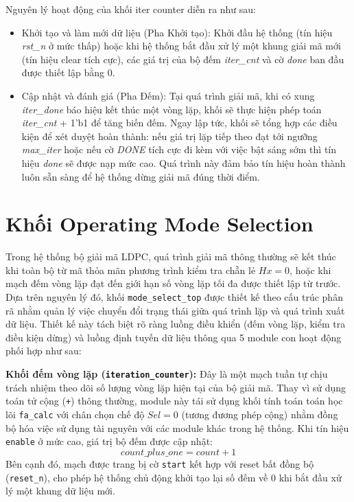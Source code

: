 \documentclass[12pt,a4paper,oneside]{book}
\begin{document}
Nguyên lý hoạt động của khối iter counter diễn ra như sau:
\begin{itemize}
    \item Khởi tạo và làm mới dữ liệu (Pha Khởi tạo): Khởi đầu hệ thống (tín hiệu \textit{rst\_n} ở mức thấp) hoặc khi hệ thống bắt đầu xử lý một khung giải mã mới (tín hiệu clear tích cực), các giá trị của bộ đếm \textit{iter\_cnt} và cờ \textit{done} ban đầu được thiết lập bằng 0.
    \item Cập nhật và đánh giá (Pha Đếm): Tại quá trình giải mã, khi có xung \textit{iter\_done} báo hiệu kết thúc một vòng lặp, khối sẽ thực hiện phép toán \textit{iter\_cnt} + 1'b1 để tăng biến đếm. Ngay lập tức, khối sẽ tổng hợp các điều kiện để xét duyệt hoàn thành: nếu giá trị lặp tiếp theo đạt tới ngưỡng \textit{max\_iter} hoặc nếu cờ \textit{DONE} tích cực đi kèm với việc bật sáng sớm thì tín hiệu \textit{done} sẽ được nạp mức cao. Quá trình này đảm bảo tín hiệu hoàn thành luôn sẵn sàng để hệ thống dừng giải mã đúng thời điểm. 
\end{itemize}

\section{Khối Operating Mode Selection}
Trong hệ thống bộ giải mã LDPC, quá trình giải mã thông thường sẽ kết thúc khi toàn bộ từ mã thỏa mãn phương trình kiểm tra chẵn lẻ $Hx = 0$, hoặc khi mạch đếm vòng lặp đạt đến giới hạn số vòng lặp tối đa được thiết lập từ trước. Dựa trên nguyên lý đó, khối \texttt{mode\_select\_top} được thiết kế theo cấu trúc phân rã nhằm quản lý việc chuyển đổi trạng thái giữa quá trình lặp và quá trình xuất dữ liệu. Thiết kế này tách biệt rõ ràng luồng điều khiển (đếm vòng lặp, kiểm tra điều kiện dừng) và luồng định tuyến dữ liệu thông qua 5 module con hoạt động phối hợp như sau:

\textbf{Khối đếm vòng lặp (\texttt{iteration\_counter}):} Đây là một mạch tuần tự chịu trách nhiệm theo dõi số lượng vòng lặp hiện tại của bộ giải mã. Thay vì sử dụng toán tử cộng (\texttt{+}) thông thường, module này tái sử dụng khối tính toán toán học lõi \texttt{fa\_calc} với chân chọn chế độ $Sel = 0$ (tương đương phép cộng) nhằm đồng bộ hóa việc sử dụng tài nguyên với các module khác trong hệ thống. Khi tín hiệu \texttt{enable} ở mức cao, giá trị bộ đếm được cập nhật:
\begin{equation}
    count\_plus\_one = count + 1
\end{equation}
Bên cạnh đó, mạch được trang bị cờ \texttt{start} kết hợp với reset bất đồng bộ (\texttt{reset\_n}), cho phép hệ thống chủ động khởi tạo lại số đếm về 0 khi bắt đầu xử lý một khung dữ liệu mới.
\end{document}
